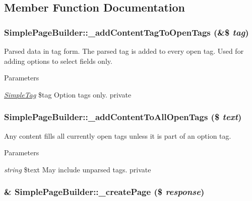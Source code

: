 \subsection{Member Function Documentation}
\hypertarget{class_simple_page_builder_ab4a16684ccda1f0d1241eb95f693efad}{
\subsubsection[{\_\-addContentTagToOpenTags}]{\setlength{\rightskip}{0pt plus 5cm}SimplePageBuilder::\_\-addContentTagToOpenTags (\&\$ {\em tag})}}
\label{class_simple_page_builder_ab4a16684ccda1f0d1241eb95f693efad}
Parsed data in tag form. The parsed tag is added to every open tag. Used for adding options to select fields only. 
\begin{DoxyParams}{Parameters}
\item[{\em \hyperlink{class_simple_tag}{SimpleTag}}]\$tag Option tags only.  private \end{DoxyParams}
\hypertarget{class_simple_page_builder_aa810b100737abf41b2f93439d4f3dfa4}{
\subsubsection[{\_\-addContentToAllOpenTags}]{\setlength{\rightskip}{0pt plus 5cm}SimplePageBuilder::\_\-addContentToAllOpenTags (\$ {\em text})}}
\label{class_simple_page_builder_aa810b100737abf41b2f93439d4f3dfa4}
Any content fills all currently open tags unless it is part of an option tag. 
\begin{DoxyParams}{Parameters}
\item[{\em string}]\$text May include unparsed tags.  private \end{DoxyParams}
\hypertarget{class_simple_page_builder_afd4eea32d22fe5fb09470d82665879d2}{
\subsubsection[{\_\-createPage}]{\setlength{\rightskip}{0pt plus 5cm}\& SimplePageBuilder::\_\-createPage (\$ {\em response})}}
